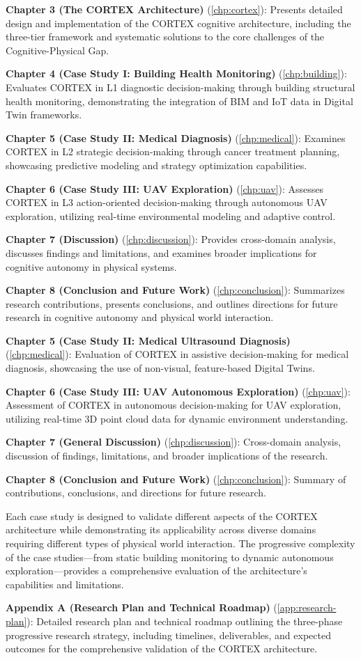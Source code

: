 \textbf{Chapter 3 (The CORTEX Architecture)} (\autoref{chp:cortex}): Presents detailed design and implementation of the CORTEX cognitive architecture, including the three-tier framework and systematic solutions to the core challenges of the Cognitive-Physical Gap.

\textbf{Chapter 4 (Case Study I: Building Health Monitoring)} (\autoref{chp:building}): Evaluates CORTEX in L1 diagnostic decision-making through building structural health monitoring, demonstrating the integration of BIM and IoT data in Digital Twin frameworks.

\textbf{Chapter 5 (Case Study II: Medical Diagnosis)} (\autoref{chp:medical}): Examines CORTEX in L2 strategic decision-making through cancer treatment planning, showcasing predictive modeling and strategy optimization capabilities.

\textbf{Chapter 6 (Case Study III: UAV Exploration)} (\autoref{chp:uav}): Assesses CORTEX in L3 action-oriented decision-making through autonomous UAV exploration, utilizing real-time environmental modeling and adaptive control.

\textbf{Chapter 7 (Discussion)} (\autoref{chp:discussion}): Provides cross-domain analysis, discusses findings and limitations, and examines broader implications for cognitive autonomy in physical systems.

\textbf{Chapter 8 (Conclusion and Future Work)} (\autoref{chp:conclusion}): Summarizes research contributions, presents conclusions, and outlines directions for future research in cognitive autonomy and physical world interaction.

\textbf{Chapter 5 (Case Study II: Medical Ultrasound Diagnosis)} (\autoref{chp:medical}): Evaluation of CORTEX in assistive decision-making for medical diagnosis, showcasing the use of non-visual, feature-based Digital Twins.

\textbf{Chapter 6 (Case Study III: UAV Autonomous Exploration)} (\autoref{chp:uav}): Assessment of CORTEX in autonomous decision-making for UAV exploration, utilizing real-time 3D point cloud data for dynamic environment understanding.

\textbf{Chapter 7 (General Discussion)} (\autoref{chp:discussion}): Cross-domain analysis, discussion of findings, limitations, and broader implications of the research.

\textbf{Chapter 8 (Conclusion and Future Work)} (\autoref{chp:conclusion}): Summary of contributions, conclusions, and directions for future research.

Each case study is designed to validate different aspects of the CORTEX architecture while demonstrating its applicability across diverse domains requiring different types of physical world interaction. The progressive complexity of the case studies—from static building monitoring to dynamic autonomous exploration—provides a comprehensive evaluation of the architecture's capabilities and limitations.

\textbf{Appendix A (Research Plan and Technical Roadmap)} (\autoref{app:research-plan}): Detailed research plan and technical roadmap outlining the three-phase progressive research strategy, including timelines, deliverables, and expected outcomes for the comprehensive validation of the CORTEX architecture.
